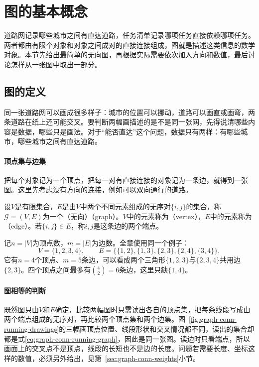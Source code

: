 \section{图的基本概念}
\label{sec:graph-basic-concepts}

道路网记录哪些城市之间有直达道路，任务清单记录哪项任务直接依赖哪项任务。两者都由有限个对象和对象之间成对的直接连接组成，图就是描述这类信息的数学对象。本节先给出最简单的无向图，再根据实际需要依次加入方向和数值，最后讨论怎样从一张图中取出一部分。

\subsection{图的定义}
\label{sec:graph-conn-definition}

同一张道路网可以画成很多样子：城市的位置可以挪动，道路可以画直或画弯，两条道路在纸上还可能交叉。要判断两幅画描述的是不是同一张网，先得说清哪些内容是数据，哪些只是画法。对于“能否直达”这个问题，数据只有两样：有哪些城市，哪些城市之间有直达道路。

\paragraph{顶点集与边集}
把每个对象记为一个顶点，把每一对有直接连接的对象记为一条边，就得到一张图。这里先考虑没有方向的连接，例如可以双向通行的道路。

\begin{definition}[图]
\label{def:graph-conn-graph}
设$V$是有限集合，$E$是由$V$中两个不同元素组成的无序对$\{i,j\}$的集合，称$\mathcal G=(V,E)$为一个（无向）（graph）。$V$中的元素称为（vertex），$E$中的元素称为（edge）。若$\{i,j\}\in E$，称$i,j$是这条边的两个端点。
\end{definition}

记$n=|V|$为顶点数，$m=|E|$为边数。全章使用同一个例子：
\begin{equation}
V=\{1,2,3,4\},\qquad
E=\bigl\{\{1,2\},\{1,3\},\{2,3\},\{2,4\},\{3,4\}\bigr\},
\label{eq:graph-conn-running-graph}
\end{equation}
它有$n=4$个顶点、$m=5$条边，可以看成两个三角形$\{1,2,3\}$与$\{2,3,4\}$共用边$\{2,3\}$。四个顶点之间最多有$\binom42=6$条边，这里只缺$\{1,4\}$。

\paragraph{图相等的判断}
既然图只由$V$和$E$确定，比较两幅图时只需读出各自的顶点集，把每条线段写成由两个端点组成的无序对，再比较两个顶点集和两个边集。图~\ref{fig:graph-conn-running-drawings}的三幅画顶点位置、线段形状和交叉情况都不同，读出的集合却都是式\eqref{eq:graph-conn-running-graph}，因此是同一张图。读边时只看端点，所以画面上的交叉点不是顶点，线段的长短也不是边的长度。问题若需要长度、坐标这样的数值，必须另外给出，见第~\ref{sec:graph-conn-weights}小节。

